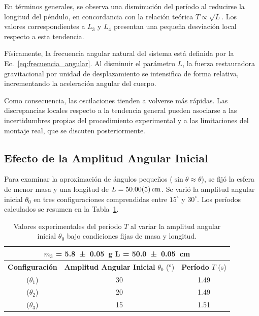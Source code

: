 En términos generales, se observa una disminución del período al reducirse la longitud del péndulo, en concordancia con la relación teórica $T \propto \sqrt{L}$. Los valores correspondientes a $L_3$ y $L_4$ presentan una pequeña desviación local respecto a esta tendencia.

Físicamente, la frecuencia angular natural del sistema está definida por la Ec.~\eqref{eq:frecuencia_angular}. Al disminuir el parámetro $L$, la fuerza restauradora gravitacional por unidad de desplazamiento se intensifica de forma relativa, incrementando la aceleración angular del cuerpo.

Como consecuencia, las oscilaciones tienden a volverse más rápidas. Las discrepancias locales respecto a la tendencia general pueden asociarse a las incertidumbres propias del procedimiento experimental y a las limitaciones del montaje real, que se discuten posteriormente.

\subsection{Efecto de la Amplitud Angular Inicial}

Para examinar la aproximación de ángulos pequeños ($\sin\theta \approx \theta$), se fijó la esfera de menor masa y una longitud de $L = \SI{50.0 \pm 0.05}{\centi\meter}$. Se varió la amplitud angular inicial $\theta_0$ en tres configuraciones comprendidas entre $15^\circ$ y $30^\circ$. Los períodos calculados se resumen en la Tabla~\ref{tab:tabla_amplitudes}.

\begin{table}[htbp]
\centering
\caption{Valores experimentales del período $T$ al variar la amplitud angular inicial $\theta_0$ bajo condiciones fijas de masa y longitud.}
\label{tab:tabla_amplitudes}
\begin{tabular}{ccc}
\toprule
\multicolumn{3}{c}{$m_3$ = \SI{5.8 \pm 0.05}{\gram} L = \SI{50.0 \pm 0.05}{\cm}} \\
\midrule
\textbf{Configuración} & \textbf{Amplitud Angular Inicial } $\theta_0$ (\si{\degree}) & \textbf{Período } $T$ (\si{\second}) \\
\midrule
($\theta_1$) & 30 & 1.49 \\
($\theta_2$) & 20 & 1.49 \\
($\theta_3$) & 15 & 1.51 \\
\bottomrule
\end{tabular}
\end{table}


